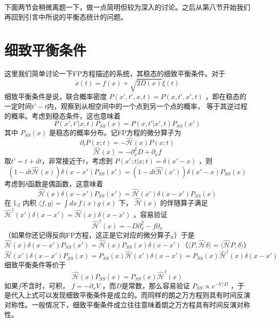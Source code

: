 \documentclass{ctexart}
\begin{document}
下面两节会稍微离题一下，做一点简明但较为深入的讨论。之后从第八节开始我们再回到引言中所说的平衡态统计的问题。

\section{细致平衡条件}
这里我们简单讨论一下FP方程描述的系统，其稳态的细致平衡条件。对于
\begin{equation}
\dot{x}(t)=f(x)+\sqrt{2D(x)}\xi(t)
\end{equation}
细致平衡条件是说，联合概率密度 $P(x',t',x,t)=P(x,t',x',t)$ ，即在稳态的一定时间$t'-t$内，观察到从相空间中的一个点到另一个点的概率， 等于其逆过程的概率。考虑到稳态条件，这也意味着
\begin{equation}
P(x',t'|x,t)P_{SS}(x)=P(x,t'|x',t)P_{SS}(x')
\end{equation}
其中 $P_{SS}(x)$ 是稳态的概率分布。记FP方程的微分算子为
\begin{equation}
\partial_t P(x;t)=-\hat{\mathcal{H}}(x)P(x;t)
\end{equation}
\begin{equation}
\hat{\mathcal{H}}(x)=-\partial^2_xD+\partial_x f
\end{equation}
取$t'=t+dt$，非常接近于$t$，考虑到 $P(x';t|x;t)=\delta(x'-x)$ ，则
\begin{equation}
(1-dt\hat{\mathcal{H}}(x))\delta(x-x')P_{SS}(x')=(1-dt\hat{\mathcal{H}}(x'))\delta(x'-x)P_{SS}(x)
\end{equation}
考虑到$\delta$函数是偶函数，这意味着
\begin{equation}
\hat{\mathcal{H}}(x)\delta(x-x')P_{SS}(x')=\hat{\mathcal{H}}(x')\delta(x-x')P_{SS}(x)
\end{equation}
在 $\mathbb{L}_2$ 内积 $\langle f,g\rangle=\int dx\, f(x)g(x)$ 下， $\hat{\mathcal{H}}(x)$ 的伴随算子满足 $\hat{\mathcal{H}}^\dagger(x')\delta(x-x')=\hat{\mathcal{H}}(x)\delta(x-x')$ ，容易验证
\begin{equation}
\hat{\mathcal{H}}^\dagger(x)=-D\partial^2_x-f\partial_x
\end{equation}
（如果你还记得反向FP方程，这正是它对应的微分算子。）于是
\begin{equation}
\hat{\mathcal{H}}(x)\delta(x-x')P_{SS}(x')=\hat{\mathcal{H}}(x)P_{SS}(x)\delta(x-x') （ \langle P,\hat{\mathcal{H}}\delta\rangle=\langle \hat{\mathcal{H}}P,\delta\rangle ）
\end{equation}
\begin{equation}
\hat{\mathcal{H}}(x')\delta(x-x')P_{SS}(x)=P_{SS}(x)\hat{\mathcal{H}}(x')\delta(x-x')=P_{SS}(x)\hat{\mathcal{H}}^\dagger(x)\delta(x-x')
\end{equation}
细致平衡条件等价于
\begin{equation}
\hat{\mathcal{H}}(x)P_{SS}(x)=P_{SS}(x)\hat{\mathcal{H}}^\dagger(x)
\end{equation}
如果$f$不含时，可积， $f=-\partial_x V$ ，而$D$是常数，那么容易验证 $P_{SS}\propto e^{-V/D}$ ，于是代入上式可以发现细致平衡条件是成立的。而同样的朗之万方程则具有时间反演对称性。一般情况下，细致平衡条件成立往往意味着朗之万方程具有时间反演对称性。
\end{document}
